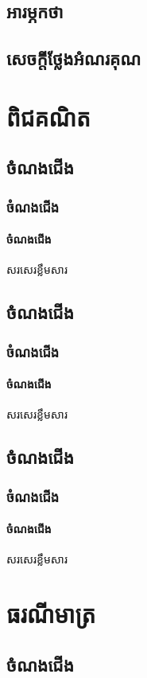 \documentclass[12pt,a4paper]{colorbook}
\begin{document}
	\frontmatter
	\tableofcontents
	\chapter{អារម្ភកថា}
	\chapter{សេចក្ដីថ្លែងអំណរគុណ}
	\mainmatter
	\part{ពិជគណិត}
	\chapter{ចំណងជើង}
	\section{ចំណងជើង}
	\subsection{ចំណងជើង}
	សរសេរខ្លឹមសារ
	\chapter{ចំណងជើង}
	\section{ចំណងជើង}
	\subsection{ចំណងជើង}
	សរសេរខ្លឹមសារ
	\chapter{ចំណងជើង}
	\section{ចំណងជើង}
	\subsection{ចំណងជើង}
	សរសេរខ្លឹមសារ
	\part{ធរណីមាត្រ}
	\chapter{ចំណងជើង}
\end{document}
